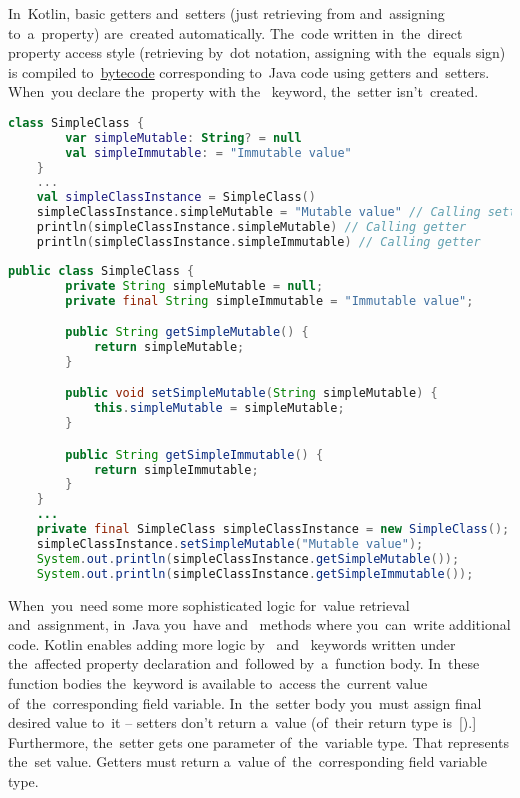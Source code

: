 \label{kotlingetset}
In~Kotlin, basic getters and~setters (just retrieving from and~assigning to~a~property) are~created automatically.
The~code written in~the~direct property access style (retrieving by~dot notation, assigning with the~equals sign) is compiled to~\hyperref[javabytecode]{bytecode} corresponding to~Java code using getters and~setters.
When~you declare the~property with the~ keyword, the~setter isn't~created.
\newline

\example
\begin{lstlisting}[language=Kotlin, title={Direct property access in Kotlin}]
    class SimpleClass {
        var simpleMutable: String? = null
        val simpleImmutable: = "Immutable value"
    }
    ...
    val simpleClassInstance = SimpleClass()
    simpleClassInstance.simpleMutable = "Mutable value" // Calling setter
    println(simpleClassInstance.simpleMutable) // Calling getter
    println(simpleClassInstance.simpleImmutable) // Calling getter
\end{lstlisting}
\newpage

\begin{lstlisting}[language=Java, title={Java equivalent}]
    public class SimpleClass {
        private String simpleMutable = null;
        private final String simpleImmutable = "Immutable value";

        public String getSimpleMutable() {
            return simpleMutable;
        }

        public void setSimpleMutable(String simpleMutable) {
            this.simpleMutable = simpleMutable;
        }

        public String getSimpleImmutable() {
            return simpleImmutable;
        }
    }
    ...
    private final SimpleClass simpleClassInstance = new SimpleClass();
    simpleClassInstance.setSimpleMutable("Mutable value");
    System.out.println(simpleClassInstance.getSimpleMutable());
    System.out.println(simpleClassInstance.getSimpleImmutable());
\end{lstlisting}
\newline

\noindent When~you~need some more sophisticated logic for~value retrieval and~assignment, in~Java you~have  and~ methods where you~can~write additional code.
Kotlin enables adding more logic by~ and~ keywords written under the~affected property declaration and~followed by~a~function body.
In~these function bodies the~keyword  is available to~access the~current value of~the~corresponding field variable.
In~the~setter body you~must assign final desired value to~it -- setters don't return a~value (of~their return type is~[).]
Furthermore, the~setter gets one parameter of~the~variable type.
That represents the~set value.
Getters must return a~value of~the~corresponding field variable type.

